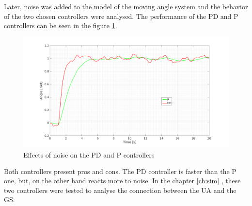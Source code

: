 Later, noise was added to the model of the moving angle system and the behavior of the two chosen controllers were analysed. The performance of the PD and P controllers can be seen in the figure \ref{fig:noise_PID}.

\begin{figure}[H]
\centerline{
\includegraphics[scale=0.35]{figures/PD_noise.png}}
\caption{Effects of noise on the PD and P controllers}
\label{fig:noise_PID}
\end{figure}

Both controllers present pros and cons. The PD controller is faster than the P one, but, on the other hand reacts more to noise. In the chapter \ref{ch:sim} , these two controllers were tested to analyse the connection between the UA and the GS.